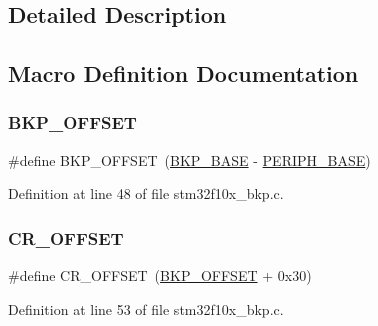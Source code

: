 \subsection{Detailed Description}


\subsection{Macro Definition Documentation}
\mbox{\label{group___b_k_p___private___defines_gaaaf71f474657e7c0c5b0d6ba9697cf5d}} 
\subsubsection{\texorpdfstring{B\+K\+P\+\_\+\+O\+F\+F\+S\+ET}{BKP\_OFFSET}}
{\footnotesize\ttfamily \#define B\+K\+P\+\_\+\+O\+F\+F\+S\+ET~(\hyperlink{group___peripheral__memory__map_gaa15d5a9f40794105397ba5ea567c4ae1}{B\+K\+P\+\_\+\+B\+A\+SE} -\/ \hyperlink{group___peripheral__memory__map_ga9171f49478fa86d932f89e78e73b88b0}{P\+E\+R\+I\+P\+H\+\_\+\+B\+A\+SE})}



Definition at line 48 of file stm32f10x\+\_\+bkp.\+c.

\mbox{\label{group___b_k_p___private___defines_gafa1d3d0ea72132df651c76fc1bdffffc}} 
\subsubsection{\texorpdfstring{C\+R\+\_\+\+O\+F\+F\+S\+ET}{CR\_OFFSET}}
{\footnotesize\ttfamily \#define C\+R\+\_\+\+O\+F\+F\+S\+ET~(\hyperlink{group___b_k_p___private___defines_gaaaf71f474657e7c0c5b0d6ba9697cf5d}{B\+K\+P\+\_\+\+O\+F\+F\+S\+ET} + 0x30)}



Definition at line 53 of file stm32f10x\+\_\+bkp.\+c.

